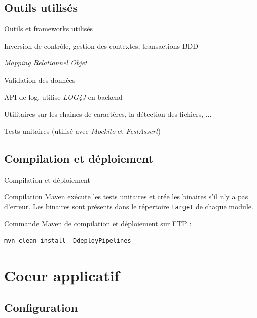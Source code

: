 \documentclass[compact]{beamer}%
\begin{document}
\subsection{Outils utilisés}

\begin{frame}{Outils et frameworks utilisés}

	\begin{description}[<+->]
	\item[Spring] Inversion de contrôle, gestion des contextes, transactions BDD
	\item[Hibernate] \emph{Mapping Relationnel Objet}
	\item[Hibernate Validator] Validation des données
	\item[SLF4J] API de log, utilise \emph{LOG4J} en backend
	\item[Commons Apache] Utilitaires sur les chaines de caractères, la détection des fichiers, ...
	\item[JUNIT] Tests unitaires (utilisé avec \emph{Mockito} et \emph{FestAssert})
	\end{description}
	
\end{frame}

\subsection{Compilation et déploiement}

\begin{frame}[fragile]{Compilation et déploiement}

	\begin{block}{Compilation}
	Maven exécute les tests unitaires et crée les binaires s'il n'y a pas d'erreur. Les binaires sont présents dans le répertoire \texttt{target} de chaque module.
	\end{block}
	
	\pause
	Commande Maven de compilation et déploiement sur FTP :
	\begin{lstlisting}
mvn clean install -DdeployPipelines
	\end{lstlisting}

\end{frame}


\section{Coeur applicatif}

\subsection{Configuration}
\end{document}
